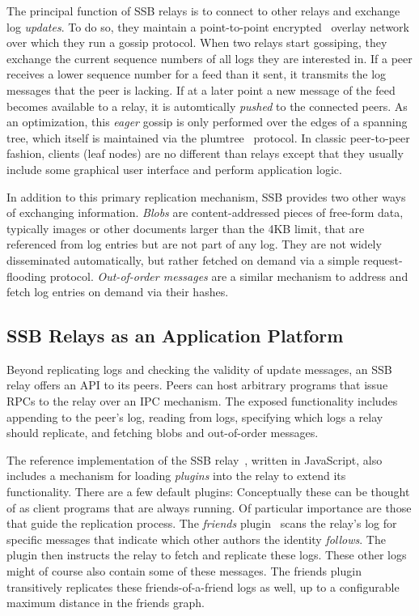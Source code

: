 \documentclass[9pt,sigconf,rewiew]{acmart}
\begin{document}
The principal function of SSB relays is to connect to other relays and exchange log {\em updates}. To do so, they maintain a point-to-point encrypted~\cite{tarr2015secrethandshake} overlay network over which they run a gossip protocol. When two relays start gossiping, they exchange the current sequence numbers of all logs they are interested in. If a peer receives a lower sequence number for a feed than it sent, it transmits the log messages that the peer is lacking. If at a later point a new message of the feed becomes available to a relay, it is automtically \textit{pushed} to the connected peers. As an optimization, this {\em eager} gossip is only performed over the edges of a spanning tree, which itself is maintained via the plumtree~\cite{leitao2007epidemic} protocol. In classic peer-to-peer fashion, clients (leaf nodes) are no different than relays except that they usually include some graphical user interface and perform application logic.

In addition to this primary replication mechanism, SSB provides two other ways of exchanging information. {\em Blobs} are content-addressed pieces of free-form data, typically images or other documents larger than the 4KB limit, that are referenced from log entries but are not part of any log. They are not widely disseminated automatically, but rather fetched on demand via a simple request-flooding protocol. {\em Out-of-order messages} are a similar mechanism to address and fetch log entries on demand via their hashes.

\subsection*{SSB Relays as an Application Platform}

Beyond replicating logs and checking the validity of update messages, an SSB relay offers an API to its peers. Peers can host arbitrary programs that issue RPCs to the relay over an IPC mechanism. The exposed functionality includes appending to the peer's log, reading from logs, specifying which logs a relay should replicate, and fetching blobs and out-of-order messages.

The reference implementation of the SSB relay~\cite{ssb-server}, written in JavaScript, also includes a mechanism for loading {\em plugins} into the relay to extend its functionality. There are a few default plugins: Conceptually these can be thought of as client programs that are always running. Of particular importance are those that guide the replication process. The {\em friends} plugin~\cite{ssb-friends} scans the relay's log for specific messages that indicate which other authors the identity {\em follows}. The plugin then instructs the relay to fetch and replicate these logs. These other logs might of course also contain some of these messages. The friends plugin transitively replicates these friends-of-a-friend logs as well, up to a configurable maximum distance in the friends graph.
\end{document}
